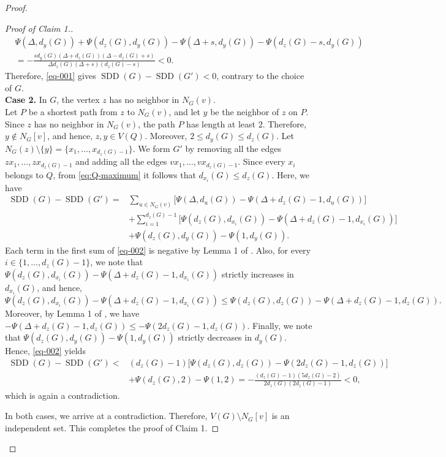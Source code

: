 \documentclass[10pt]{article}
\newcommand{\SDD}{\operatorname{SDD}}
\begin{document}
\begin{proof}
\begin{proof}[Proof of Claim 1.]
\begin{align*}
&\Psi(\Delta,d_y(G))+\Psi(d_z(G),d_y(G))-\Psi(\Delta+s,d_y(G))
       -\Psi(d_z(G)-s,d_y(G))\\
&= -\frac{s d_y(G)(\Delta+d_z(G))(\Delta-d_z(G)+s)}
 {\Delta d_z(G)(\Delta+s)(d_z(G)-s)}<0.
\end{align*}
Therefore,
\eqref{eq-001} gives
$\SDD(G)-\SDD(G')<0$, contrary to the choice of $G$.\\[2mm]
{\bf Case 2.}
In $G$, the vertex $z$ has no neighbor in $N_G(v)$.\\
Let $P$ be a shortest path from $z$ to $N_G(v)$, and let $y$ be the
neighbor of $z$ on $P$. Since $z$ has no neighbor in $N_G(v)$, the path
$P$ has length at least $2$. Therefore, $y\notin N_G[v]$, and hence, $z,y\in V(Q)$. Moreover, $2\le d_y(G)\le d_z(G)$. Let
$N_G(z)\setminus\{y\}=\{x_1,\ldots,x_{d_z(G)-1}\}$. We form $G'$ by
removing all the edges $zx_1,\ldots,zx_{d_z(G)-1}$ and adding all the edges $vx_1,\ldots,vx_{d_z(G)-1}$.
Since every $x_i$ belongs to $Q$, from
\eqref{eq:Q-maximum} it follows that $d_{x_i}(G)\le d_z(G)$. Here, we have
\begin{align}\label{eq-002}
\SDD(G)-\SDD(G')
={}&\sum_{u\in N_G(v)}
 \bigl[\Psi(\Delta,d_u(G))
       -\Psi(\Delta+d_z(G)-1,d_u(G))\big]\nonumber\\
&+\sum_{i=1}^{d_z(G)-1}
 \bigl[\Psi(d_z(G),d_{x_i}(G))
       -\Psi(\Delta+d_z(G)-1,d_{x_i}(G))\big]\nonumber\\
&+\Psi(d_z(G),d_y(G))-\Psi(1,d_y(G)).
\end{align}
Each term in the first sum of \eqref{eq-002} is negative by Lemma 1 of \cite{AlbalahiAli2022}. Also, for every $i\in\{1,\dots,d_z(G)-1\}$, we note that $\Psi(d_z(G),d_{x_i}(G))
       -\Psi(\Delta+d_z(G)-1,d_{x_i}(G))$ strictly increases in $d_{x_i}(G)$, and hence,
       $$\Psi(d_z(G),d_{x_i}(G))
       -\Psi(\Delta+d_z(G)-1,d_{x_i}(G)) \le \Psi(d_z(G),d_{z}(G))
       -\Psi(\Delta+d_z(G)-1,d_{z}(G)).$$
       Moreover, by Lemma 1 of \cite{AlbalahiAli2022}, we have $-\Psi(\Delta+d_z(G)-1,d_{z}(G))\le-\Psi(2d_z(G)-1,d_{z}(G))$.
        Finally, we note that $\Psi(d_z(G),d_y(G))-\Psi(1,d_y(G))$ strictly decreases in $d_y(G)$. Hence, \eqref{eq-002} yields
\begin{align*}
\SDD(G)-\SDD(G')
<{}&(d_z(G)-1)
 \bigl[\Psi(d_z(G),d_{z}(G))
-\Psi(2d_z(G)-1,d_{z}(G))\big]\\
&+\Psi(d_z(G),2)-\Psi(1,2)=-\frac{(d_z(G)-1)(5d_z(G)-2)}{2d_z(G)(2d_z(G)-1)}<0,
\end{align*}
which is again a contradiction.


 In both cases, we arrive at a contradiction. Therefore, $V(G)\setminus N_G[v]$ is an independent set. This completes the proof of Claim 1.
\end{proof}



\end{proof}
\end{document}
